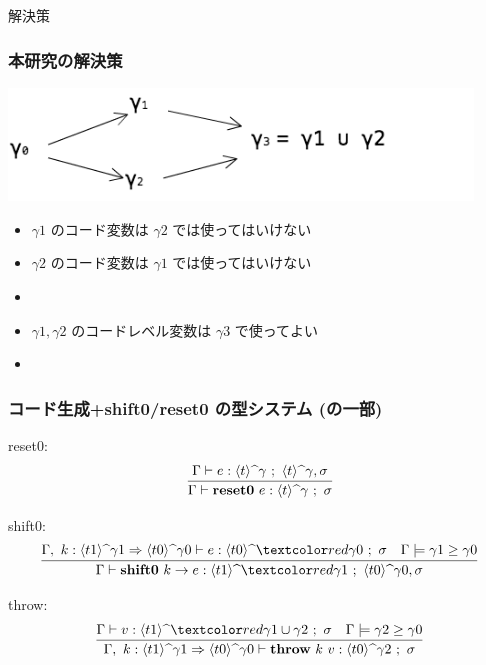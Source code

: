 
\begin{frame}
  \center
  \huge{解決策}
\end{frame}

\begin{frame}
  \frametitle{本研究の解決策}
  \flushleft
  \includegraphics[clip,height=3cm]{./img/ecgraph.png}
  \begin{itemize}
  \item<2-> $\gamma1$ のコード変数は $\gamma2$ では使ってはいけない
  \item<2-> $\gamma2$ のコード変数は $\gamma1$ では使ってはいけない
  \item<3->[$\Rightarrow$] 
  \end{itemize}

  \begin{itemize}
  \item<4-> $\gamma1, \gamma2$ のコードレベル変数は $\gamma3$ で使ってよい
  \item<5->[$\Rightarrow$]  %
  \end{itemize}
\end{frame}

\begin{frame}[fragile]
  \frametitle{コード生成+shift0/reset0 の型システム\small{ (の一部)}}
  reset0:
  \[
    \infer{\Gamma \vdash \resetz{e} : \codeTs{t}{\gamma} ~;~ \sigma}
    {\Gamma \vdash e : \codeTs{t}{\gamma} ~;~ \codeTs{t}{\gamma}, \sigma}
  \]

  shift0:
  \[
    \infer{\Gamma \vdash \shiftz{k}{e} : \codeTs{t1}{\red{\gamma1}} ~;~ \codeTs{t0}{\gamma0},\sigma}
    {\Gamma,~k:\contT{\codeTs{t1}{\gamma1}}{\codeTs{t0}{\gamma0}}
      \vdash e : \codeTs{t0}{\red{\gamma0}} ~;~ \sigma
      & \Gamma \models \gamma1 \ord \gamma0
    }
  \]

  throw:
  \[
    \infer
    {\Gamma,~k:\contT{\codeTs{t1}{\gamma1}}{\codeTs{t0}{\gamma0}}
      \vdash \throw{k}{v} : \codeTs{t0}{\gamma2} ~;~ \sigma}
    {\Gamma
      \vdash v : \codeTs{t1}{\red{\gamma1 \cup \gamma2}} ~;~ \sigma
      & \Gamma \models \gamma2 \ord \gamma0
    }
  \]
\end{frame}


